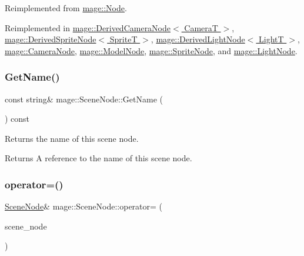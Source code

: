 Reimplemented from \hyperlink{classmage_1_1_node_a71a4763bfd4cba5653488b490e61dc8f}{mage\+::\+Node}.



Reimplemented in \hyperlink{classmage_1_1_derived_camera_node_aa965751029ebd6b41d3805b499a8304e}{mage\+::\+Derived\+Camera\+Node$<$ Camera\+T $>$}, \hyperlink{classmage_1_1_derived_sprite_node_ae1aa2b80d4ff8688635df017826c11a5}{mage\+::\+Derived\+Sprite\+Node$<$ Sprite\+T $>$}, \hyperlink{classmage_1_1_derived_light_node_acf8858989780bf45a45c55a7c5564314}{mage\+::\+Derived\+Light\+Node$<$ Light\+T $>$}, \hyperlink{classmage_1_1_camera_node_a002d3a2b41cda270a26ca5d8f3a17f55}{mage\+::\+Camera\+Node}, \hyperlink{classmage_1_1_model_node_a34146201083015276b38240af307417f}{mage\+::\+Model\+Node}, \hyperlink{classmage_1_1_sprite_node_a83a2a865b38670d64491a1066895e218}{mage\+::\+Sprite\+Node}, and \hyperlink{classmage_1_1_light_node_aea97601d0a4b8073a1c655ca334af242}{mage\+::\+Light\+Node}.

\hypertarget{classmage_1_1_scene_node_ab4d72e26370747c06ccb1461f3080b31}{}\label{classmage_1_1_scene_node_ab4d72e26370747c06ccb1461f3080b31} 
\subsubsection{\texorpdfstring{Get\+Name()}{GetName()}}
{\footnotesize\ttfamily const string\& mage\+::\+Scene\+Node\+::\+Get\+Name (\begin{DoxyParamCaption}{ }\end{DoxyParamCaption}) const\hspace{0.3cm}{\ttfamily [noexcept]}}

Returns the name of this scene node.

\begin{DoxyReturn}{Returns}
A reference to the name of this scene node. 
\end{DoxyReturn}
\hypertarget{classmage_1_1_scene_node_af4298cbc808139f9da43055afdfe8f7e}{}\label{classmage_1_1_scene_node_af4298cbc808139f9da43055afdfe8f7e} 
\subsubsection{\texorpdfstring{operator=()}{operator=()}\hspace{0.1cm}{\footnotesize\ttfamily [1/2]}}
{\footnotesize\ttfamily \hyperlink{classmage_1_1_scene_node}{Scene\+Node}\& mage\+::\+Scene\+Node\+::operator= (\begin{DoxyParamCaption}\item[{const \hyperlink{classmage_1_1_scene_node}{Scene\+Node} \&}]{scene\+\_\+node }\end{DoxyParamCaption})\hspace{0.3cm}{\ttfamily [delete]}}

